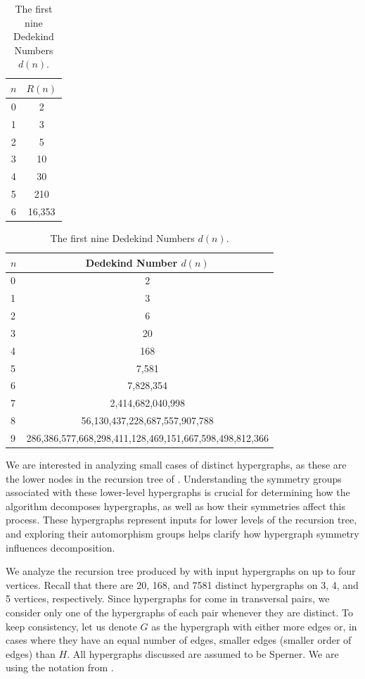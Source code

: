 \begin{table}[h]
\begin{minipage}[b]{0.38\linewidth}\centering
{\Large
\begin{tabular}{|c|c|}
\hline
$n$ & $R(n)$\\\hline
0 & 2\\\hline
1 & 3\\\hline
2 & 5\\\hline
3 & 10\\\hline
4 & 30\\\hline
5 & 210\\\hline
6 & 16,353\\\hline
\end{tabular}}
\caption{Number of total permutations of hypergraphs on $n$ vertices. (\texttt{A003182}, \cite{SY14})}
\end{minipage}\hfill
\begin{minipage}[b]{0.58\linewidth}\centering
{\tiny
\begin{tabular}{|l|c|}
\hline
$n$ & Dedekind Number $d(n)$\\\hline
0 & 2\\\hline
1 & 3\\\hline
2 & 6\\\hline
3 & 20\\\hline
4 & 168\\\hline
5 & 7,581\\\hline
6 & 7,828,354\\\hline
7 & 2,414,682,040,998\\\hline
8 & 56,130,437,228,687,557,907,788\\\hline
9 & 286,386,577,668,298,411,128,469,151,667,598,498,812,366\\\hline
\end{tabular}}
\caption{The first nine Dedekind Numbers $d(n)$.}
\end{minipage}
\end{table}

We are interested in analyzing small cases of distinct hypergraphs, as these are the lower nodes in the recursion tree of \FKA. Understanding the symmetry groups associated with these lower-level hypergraphs is crucial for determining how the \FKA{} algorithm decomposes hypergraphs, as well as how their symmetries affect this process. These hypergraphs represent inputs for lower levels of the recursion tree, and exploring their automorphism groups helps clarify how hypergraph symmetry influences \FKA{} decomposition.

We analyze the recursion tree produced by \FKA{} with input hypergraphs on up to four vertices. Recall that there are 20, 168, and 7581 distinct hypergraphs on 3, 4, and 5 vertices, respectively. Since hypergraphs for \FKA{} come in transversal pairs, we consider only one of the hypergraphs of each pair whenever they are distinct. To keep consistency, let us denote $G$ as the hypergraph with either more edges or, in cases where they have an equal number of edges, smaller edges (smaller order of edges) than $H$. All hypergraphs discussed are assumed to be Sperner. We are using the notation from \cite{SS24}.

